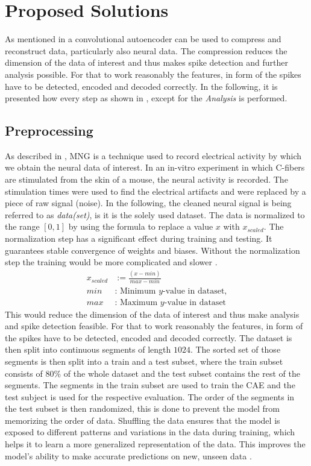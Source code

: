 \section{Proposed Solutions}
\label{sec:propSolutions}
As mentioned in  a convolutional autoencoder can be used to compress and reconstruct data, particularly also neural data. 
The compression reduces the dimension of the data of interest and thus makes spike detection and further analysis possible.
For that to work reasonably the features, in form of the spikes have to be detected, encoded and decoded correctly. 
In the following, it is presented how every step as shown in , except for the \textit{Analysis} is performed.
\subsection{Preprocessing} \label{sec:preprocessing}
As described in , MNG is a technique used to record electrical activity by which we obtain the neural data of interest.
In an in-vitro experiment in which C-fibers are stimulated from the skin of a mouse, the neural activity is recorded. 
The stimulation times were used to find the electrical artifacts and were replaced by a piece of raw signal (noise).
In the following, the cleaned neural signal is being referred to as \textit{data(set)}, is it is the solely used dataset.
The data is normalized to the range $[0,1]$ by using the formula  to replace a value $x$ with $x_{scaled}$. 
The normalization step has a significant effect during training and testing. 
It guarantees stable convergence of weights and biases. 
Without the normalization step the training would be more complicated and slower \cite{brownlee2016deep}.
\begin{equation}
	\begin{split}
		x_{scaled} &:= \frac{(x -min)}{max - min} \\
		min &\text{: Minimum $y$-value in dataset,} \\
		max &\text{: Maximum $y$-value in dataset}
	\end{split}
	\label{eq:normalized}
\end{equation}This would reduce the dimension of the data of interest and thus make analysis and spike detection feasible.
For that to work reasonably the features, in form of the spikes have to be detected, encoded and decoded correctly. 
The dataset is then split into continuous segments of length $1024$.
The sorted set of those segments is then split into a train and a test subset, where the train subset consists of $80\%$ of the whole dataset and the test subset contains the rest of the segments. 
The segments in the train subset are used to train the CAE and the test subject is used for the respective evaluation.
The order of the segments in the test subset is then randomized, this is done to prevent the model from memorizing the order of data.
Shuffling the data ensures that the model is exposed to different patterns and variations in the data during training, which helps it to learn a more generalized representation of the data. 
This improves the model's ability to make accurate predictions on new, unseen data \cite{geron2017hands,meng2019convergence}.
